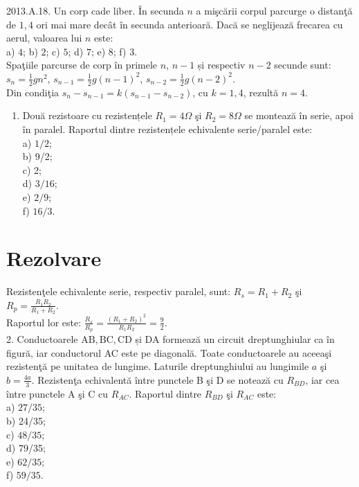 2013.A.18. Un corp cade liber. În secunda $n$ a mişcării corpul parcurge o distanţă de $1,4$ ori mai mare decât în secunda anterioară. Dacă se neglijează frecarea cu aerul, valoarea lui $n$ este:\\ a) $4$; b) $2$; c) $5$; d) $7$; e) $8$; f) $3$.\\ Spaţiile parcurse de corp în primele $n$, $n-1$ și respectiv $n-2$ secunde sunt: $s_{n}=\frac{1}{2} g n^{2}$, $s_{n-1}=\frac{1}{2} g(n-1)^{2}$, $s_{n-2}=\frac{1}{2} g(n-2)^{2}$.\\ Din condiţia $s_{n}-s_{n-1}=k\left(s_{n-1}-s_{n-2}\right)$, cu $k=1,4$, rezultă $n=4$.\\


\begin{enumerate}
  \item Două rezistoare cu rezistențele $R_{1}=4 \Omega$ şi $R_{2}=8 \Omega$ se montează în serie, apoi în paralel. Raportul dintre rezistențele echivalente serie/paralel este:\\
a) $1 / 2$;\\
b) 9/2;\\
c) 2;\\
d) $3 / 16$;\\
e) $2 / 9$;\\
f) $16 / 3$.
\end{enumerate}

\section*{Rezolvare}
Rezistenţele echivalente serie, respectiv paralel, sunt: $R_{s}=R_{1}+R_{2}$ şi $R_{p}=\frac{R_{1} R_{2}}{R_{1}+R_{2}}$.\\
Raportul lor este: $\frac{R_{s}}{R_{p}}=\frac{\left(R_{1}+R_{2}\right)^{2}}{R_{1} R_{2}}=\frac{9}{2}$.\\
2. Conductoarele $\mathrm{AB}, \mathrm{BC}, \mathrm{CD}$ și DA formează un circuit dreptunghiular ca în figură, iar conductorul AC este pe diagonală. Toate conductoarele au aceeaşi rezistenţă pe unitatea de lungime. Laturile dreptunghiului au lungimile $a$ şi $b=\frac{4 a}{3}$. Rezistenţa echivalentă între punctele B şi D se notează cu $R_{B D}$, iar cea între punctele A şi C cu $R_{A C}$. Raportul dintre $R_{B D}$ şi $R_{A C}$ este:\\
a) $27 / 35$;\\
b) 24/35;\\
c) $48 / 35$;\\
d) 79/35;\\
e) $62 / 35$;\\
f) $59 / 35$.

